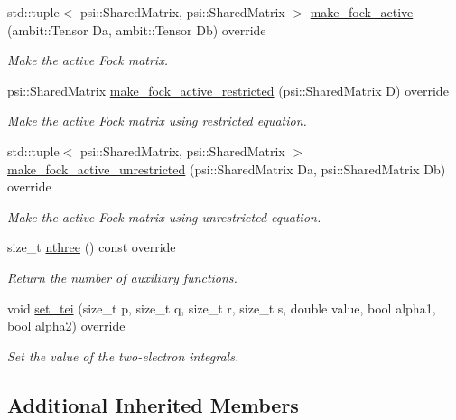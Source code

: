 \begin{DoxyCompactItemize}
std\+::tuple$<$ psi\+::\+Shared\+Matrix, psi\+::\+Shared\+Matrix $>$ \mbox{\hyperlink{classforte_1_1_custom_integrals_aab638e735541a02c266c8ed5bf25af3a}{make\+\_\+fock\+\_\+active}} (ambit\+::\+Tensor Da, ambit\+::\+Tensor Db) override
\begin{DoxyCompactList}\small\item\em Make the active Fock matrix. \end{DoxyCompactList}\item 
psi\+::\+Shared\+Matrix \mbox{\hyperlink{classforte_1_1_custom_integrals_a8079cb2a8c6b71608db08667694183b9}{make\+\_\+fock\+\_\+active\+\_\+restricted}} (psi\+::\+Shared\+Matrix D) override
\begin{DoxyCompactList}\small\item\em Make the active Fock matrix using restricted equation. \end{DoxyCompactList}\item 
std\+::tuple$<$ psi\+::\+Shared\+Matrix, psi\+::\+Shared\+Matrix $>$ \mbox{\hyperlink{classforte_1_1_custom_integrals_a87a7d17ddd89c004adf56b032d409669}{make\+\_\+fock\+\_\+active\+\_\+unrestricted}} (psi\+::\+Shared\+Matrix Da, psi\+::\+Shared\+Matrix Db) override
\begin{DoxyCompactList}\small\item\em Make the active Fock matrix using unrestricted equation. \end{DoxyCompactList}\item 
size\+\_\+t \mbox{\hyperlink{classforte_1_1_custom_integrals_aa8813730038bbc062d8e08d33600c27d}{nthree}} () const override
\begin{DoxyCompactList}\small\item\em Return the number of auxiliary functions. \end{DoxyCompactList}\item 
void \mbox{\hyperlink{classforte_1_1_custom_integrals_ab9b7fd99d359eedcde4fcbf5e5df1795}{set\+\_\+tei}} (size\+\_\+t p, size\+\_\+t q, size\+\_\+t r, size\+\_\+t s, double value, bool alpha1, bool alpha2) override
\begin{DoxyCompactList}\small\item\em Set the value of the two-\/electron integrals. \end{DoxyCompactList}\end{DoxyCompactItemize}
\subsection*{Additional Inherited Members}


